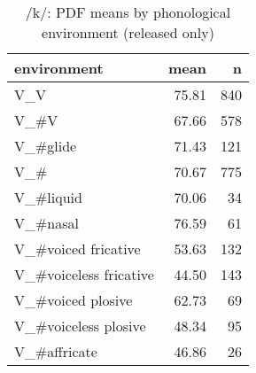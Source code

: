 \begin{table}[h]
	\centering
	\caption{/k/: PDF means by phonological environment (released only)}
	\label{tab.k.mean.environment}
	\begin{tabular}{lrr}
		\toprule
		environment & mean \isi{PDF} & n\\
		\midrule
		V\_V & 75.81 & 840\\
		V\_\#V & 67.66 & 578\\
		V\_\#glide & 71.43 & 121\\
		V\_\# & 70.67 & 775\\
		V\_\#liquid & 70.06 & 34\\
		V\_\#nasal & 76.59 & 61\\
		V\_\#voiced fricative & 53.63 & 132\\
		V\_\#voiceless fricative & 44.50 & 143\\
		V\_\#voiced plosive & 62.73 & 69\\
		V\_\#voiceless plosive & 48.34 & 95\\
		V\_\#affricate & 46.86 & 26\\
		\bottomrule
	\end{tabular}
\end{table}

